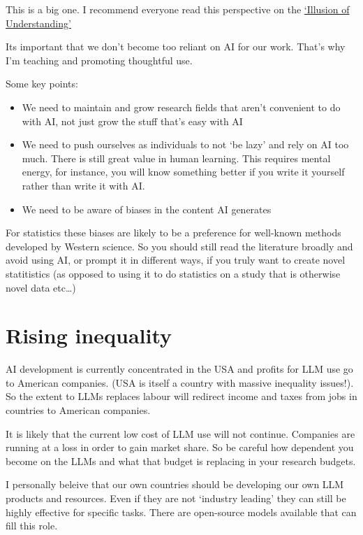 \documentclass[
  letterpaper,
  DIV=11,
  numbers=noendperiod]{scrreprt}
\providecommand{\tightlist}{%
  \setlength{\itemsep}{0pt}\setlength{\parskip}{0pt}}\usepackage{longtable,booktabs,array}
\begin{document}
This is a big one. I recommend everyone read this perspective on the
\href{https://www.nature.com/articles/s41586-024-07146-0}{`Illusion of
Understanding'}

Its important that we don't become too reliant on AI for our work.
That's why I'm teaching and promoting thoughtful use.

Some key points:

\begin{itemize}
\tightlist
\item
  We need to maintain and grow research fields that aren't convenient to
  do with AI, not just grow the stuff that's easy with AI
\item
  We need to push ourselves as individuals to not `be lazy' and rely on
  AI too much. There is still great value in human learning. This
  requires mental energy, for instance, you will know something better
  if you write it yourself rather than write it with AI.
\item
  We need to be aware of biases in the content AI generates
\end{itemize}

For statistics these biases are likely to be a preference for well-known
methods developed by Western science. So you should still read the
literature broadly and avoid using AI, or prompt it in different ways,
if you truly want to create novel statitistics (as opposed to using it
to do statistics on a study that is otherwise novel data etc\ldots)

\section{Rising inequality}\label{rising-inequality}

AI development is currently concentrated in the USA and profits for LLM
use go to American companies. (USA is itself a country with massive
inequality issues!). So the extent to LLMs replaces labour will redirect
income and taxes from jobs in countries to American companies.

It is likely that the current low cost of LLM use will not continue.
Companies are running at a loss in order to gain market share. So be
careful how dependent you become on the LLMs and what that budget is
replacing in your research budgets.

I personally beleive that our own countries should be developing our own
LLM products and resources. Even if they are not `industry leading' they
can still be highly effective for specific tasks. There are open-source
models available that can fill this role.
\end{document}
